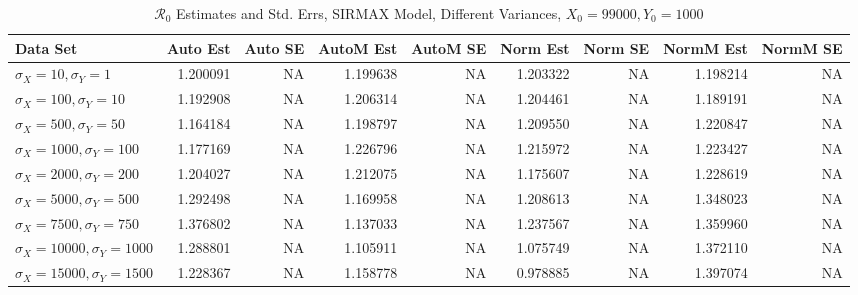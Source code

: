 \documentclass[12pt]{article}
\newcommand{\rr}{\ensuremath{\mathcal{R}_0}}
\begin{document}
\begin{table}[H]
	
	\caption{$\rr$ Estimates and Std. Errs, SIRMAX Model,
		Different Variances, 
		$X_0 = 99000, Y_0 = 1000$}
	\begin{footnotesize}
		\hskip -1.7cm
		\begin{tabular}{l|r|r|r|r|r|r|r|r}
			\hline
			Data Set & Auto Est & Auto SE & AutoM Est & AutoM SE & Norm Est & Norm SE & NormM Est & NormM SE\\
			\hline
			$\sigma_X = 10, \sigma_Y = 1$ & 1.200091 & NA & 1.199638 & NA & 1.203322 & NA & 1.198214 & NA\\
			\hline
			$\sigma_X = 100, \sigma_Y = 10$ & 1.192908 & NA & 1.206314 & NA & 1.204461 & NA & 1.189191 & NA\\
			\hline
			$\sigma_X = 500, \sigma_Y = 50$ & 1.164184 & NA & 1.198797 & NA & 1.209550 & NA & 1.220847 & NA\\
			\hline
			$\sigma_X = 1000, \sigma_Y = 100$ & 1.177169 & NA & 1.226796 & NA & 1.215972 & NA & 1.223427 & NA\\
			\hline
			$\sigma_X = 2000, \sigma_Y = 200$ & 1.204027 & NA & 1.212075 & NA & 1.175607 & NA & 1.228619 & NA\\
			\hline
			$\sigma_X = 5000, \sigma_Y = 500$ & 1.292498 & NA & 1.169958 & NA & 1.208613 & NA & 1.348023 & NA\\
			\hline
			$\sigma_X = 7500, \sigma_Y = 750$ & 1.376802 & NA & 1.137033 & NA & 1.237567 & NA & 1.359960 & NA\\
			\hline
			$\sigma_X = 10000, \sigma_Y = 1000$ & 1.288801 & NA & 1.105911 & NA & 1.075749 & NA & 1.372110 & NA\\
			\hline
			$\sigma_X = 15000, \sigma_Y = 1500$ & 1.228367 & NA & 1.158778 & NA & 0.978885 & NA & 1.397074 & NA\\
			\hline
		\end{tabular}
	\end{footnotesize}
\end{table}
\end{document}
